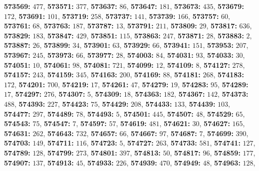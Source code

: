 \textsf{\bfseries 573569:} $477$, \textsf{\bfseries 573571:} $377$, \textsf{\bfseries 573637:} $86$, \textsf{\bfseries 573647:} $181$, \textsf{\bfseries 573673:} $435$, \textsf{\bfseries 573679:} $172$, \textsf{\bfseries 573691:} $101$, \textsf{\bfseries 573719:} $258$, \textsf{\bfseries 573737:} $141$, \textsf{\bfseries 573739:} $166$, \textsf{\bfseries 573757:} $60$, \textsf{\bfseries 573761:} $68$, \textsf{\bfseries 573763:} $187$, \textsf{\bfseries 573787:} $13$, \textsf{\bfseries 573791:} $211$, \textsf{\bfseries 573809:} $29$, \textsf{\bfseries 573817:} $636$, \textsf{\bfseries 573829:} $183$, \textsf{\bfseries 573847:} $429$, \textsf{\bfseries 573851:} $115$, \textsf{\bfseries 573863:} $247$, \textsf{\bfseries 573871:} $28$, \textsf{\bfseries 573883:} $2$, \textsf{\bfseries 573887:} $26$, \textsf{\bfseries 573899:} $34$, \textsf{\bfseries 573901:} $63$, \textsf{\bfseries 573929:} $66$, \textsf{\bfseries 573941:} $151$, \textsf{\bfseries 573953:} $207$, \textsf{\bfseries 573967:} $245$, \textsf{\bfseries 573973:} $66$, \textsf{\bfseries 573977:} $28$, \textsf{\bfseries 574003:} $84$, \textsf{\bfseries 574031:} $93$, \textsf{\bfseries 574033:} $30$, \textsf{\bfseries 574051:} $10$, \textsf{\bfseries 574061:} $98$, \textsf{\bfseries 574081:} $721$, \textsf{\bfseries 574099:} $12$, \textsf{\bfseries 574109:} $8$, \textsf{\bfseries 574127:} $278$, \textsf{\bfseries 574157:} $243$, \textsf{\bfseries 574159:} $345$, \textsf{\bfseries 574163:} $200$, \textsf{\bfseries 574169:} $88$, \textsf{\bfseries 574181:} $268$, \textsf{\bfseries 574183:} $172$, \textsf{\bfseries 574201:} $700$, \textsf{\bfseries 574219:} $17$, \textsf{\bfseries 574261:} $47$, \textsf{\bfseries 574279:} $19$, \textsf{\bfseries 574283:} $95$, \textsf{\bfseries 574289:} $17$, \textsf{\bfseries 574297:} $276$, \textsf{\bfseries 574307:} $5$, \textsf{\bfseries 574309:} $18$, \textsf{\bfseries 574363:} $182$, \textsf{\bfseries 574367:} $142$, \textsf{\bfseries 574373:} $488$, \textsf{\bfseries 574393:} $227$, \textsf{\bfseries 574423:} $75$, \textsf{\bfseries 574429:} $208$, \textsf{\bfseries 574433:} $133$, \textsf{\bfseries 574439:} $103$, \textsf{\bfseries 574477:} $297$, \textsf{\bfseries 574489:} $78$, \textsf{\bfseries 574493:} $5$, \textsf{\bfseries 574501:} $445$, \textsf{\bfseries 574507:} $48$, \textsf{\bfseries 574529:} $65$, \textsf{\bfseries 574543:} $75$, \textsf{\bfseries 574547:} $7$, \textsf{\bfseries 574597:} $57$, \textsf{\bfseries 574619:} $481$, \textsf{\bfseries 574621:} $30$, \textsf{\bfseries 574627:} $165$, \textsf{\bfseries 574631:} $262$, \textsf{\bfseries 574643:} $732$, \textsf{\bfseries 574657:} $66$, \textsf{\bfseries 574667:} $97$, \textsf{\bfseries 574687:} $7$, \textsf{\bfseries 574699:} $390$, \textsf{\bfseries 574703:} $149$, \textsf{\bfseries 574711:} $116$, \textsf{\bfseries 574723:} $5$, \textsf{\bfseries 574727:} $263$, \textsf{\bfseries 574733:} $581$, \textsf{\bfseries 574741:} $127$, \textsf{\bfseries 574789:} $128$, \textsf{\bfseries 574799:} $273$, \textsf{\bfseries 574801:} $397$, \textsf{\bfseries 574813:} $50$, \textsf{\bfseries 574817:} $96$, \textsf{\bfseries 574859:} $177$, \textsf{\bfseries 574907:} $137$, \textsf{\bfseries 574913:} $45$, \textsf{\bfseries 574933:} $226$, \textsf{\bfseries 574939:} $470$, \textsf{\bfseries 574949:} $48$, \textsf{\bfseries 574963:} $128$, 
